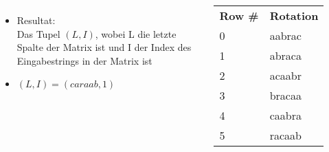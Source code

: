 \documentclass[14pt,xcolor=dvipsnames,pdftex]{beamer}
\begin{document}
\begin{frame}[allowframebreaks]
\begin{columns}[c,onlytextwidth]
 \begin{itemize}
  \item Resultat:\\
      Das Tupel \textit{$(L,I)$}, wobei L die {\color{red}letzte Spalte} der Matrix ist
      und I der Index des {\color{darkgreen}Eingabestrings in der Matrix} ist
  \item $(L,I) = (caraab, 1)$
 \end{itemize}
    \begin{tabular}{T|T}
    \textbf{Row \#} & \textbf{Rotation} \\
    0 & aabra{\color{red}c} \\
    {\color{darkgreen}1} & {\color{darkgreen}abrac}{\color{red}a} \\
    2 & acaab{\color{red}r} \\
    3 & braca{\color{red}a} \\
    4 & caabr{\color{red}a} \\
    5 & racaa{\color{red}b} \\
    \end{tabular}
\end{columns}
\end{frame}
\end{document}
